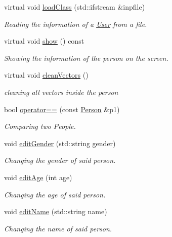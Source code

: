 \begin{DoxyCompactItemize}
virtual void \mbox{\hyperlink{class_person_af07a032df8d56dddade4dc43960b536b}{load\+Class}} (std\+::ifstream \&inpfile)
\begin{DoxyCompactList}\small\item\em Reading the information of a \mbox{\hyperlink{class_user}{User}} from a file. \end{DoxyCompactList}\item 
\mbox{\label{class_person_a0206a035f0e88297c8f1c09933dcc86f}} 
virtual void \mbox{\hyperlink{class_person_a0206a035f0e88297c8f1c09933dcc86f}{show}} () const
\begin{DoxyCompactList}\small\item\em Showing the information of the person on the screen. \end{DoxyCompactList}\item 
\mbox{\label{class_person_ae524672604b31635f981361d604bac7b}} 
virtual void \mbox{\hyperlink{class_person_ae524672604b31635f981361d604bac7b}{clean\+Vectors}} ()
\begin{DoxyCompactList}\small\item\em cleaning all vectors inside the person \end{DoxyCompactList}\item 
bool \mbox{\hyperlink{class_person_aa2fe338cbcf08ee5981dce811fd3a50a}{operator==}} (const \mbox{\hyperlink{class_person}{Person}} \&p1)
\begin{DoxyCompactList}\small\item\em Comparing two People. \end{DoxyCompactList}\item 
void \mbox{\hyperlink{class_person_a3462440c2938aaea073cdaeeb9c0ad9d}{edit\+Gender}} (std\+::string gender)
\begin{DoxyCompactList}\small\item\em Changing the gender of said person. \end{DoxyCompactList}\item 
void \mbox{\hyperlink{class_person_af00065ecb43ca488a2f90fe5dc796095}{edit\+Age}} (int age)
\begin{DoxyCompactList}\small\item\em Changing the age of said person. \end{DoxyCompactList}\item 
void \mbox{\hyperlink{class_person_ade234dfe2fb73a9ae41bac93b52c17c6}{edit\+Name}} (std\+::string name)
\begin{DoxyCompactList}\small\item\em Changing the name of said person. \end{DoxyCompactList}\end{DoxyCompactItemize}


